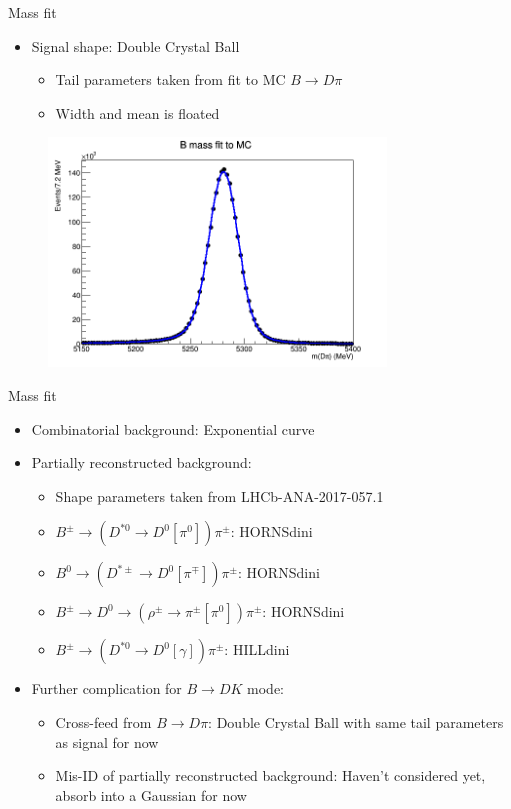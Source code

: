 \documentclass{beamer}
\begin{document}
\begin{frame}{Mass fit}
  \begin{itemize}
    \item{Signal shape: Double Crystal Ball}
    \begin{itemize}
      \item{Tail parameters taken from fit to MC $B\to D\pi$}
      \item{Width and mean is floated}
    \end{itemize}
  \end{itemize}
  \begin{figure}
    \includegraphics[width = 0.8\textwidth]{MassFitMC.png}
  \end{figure}
\end{frame}

\begin{frame}{Mass fit}
  \begin{itemize}
    \setlength\itemsep{1.3em}
    \item{Combinatorial background: Exponential curve}
    \item{Partially reconstructed background:}
    \begin{itemize}
      \item{Shape parameters taken from LHCb-ANA-2017-057.1}
      \item{$B^\pm\to(D^{*0}\to D^0[\pi^0])\pi^\pm$: HORNSdini}
      \item{$B^0\to(D^{*\pm}\to D^0[\pi^\mp])\pi^\pm$: HORNSdini}
      \item{$B^\pm\to D^0\to(\rho^\pm\to\pi^\pm[\pi^0])\pi^\pm$: HORNSdini}
      \item{$B^\pm\to(D^{*0}\to D^0[\gamma])\pi^\pm$: HILLdini}
    \end{itemize}
    \item{Further complication for $B\to DK$ mode:}
    \begin{itemize}
      \item{Cross-feed from $B\to D\pi$: Double Crystal Ball with same tail parameters as signal for now}
      \item{Mis-ID of partially reconstructed background: Haven't considered yet, absorb into a Gaussian for now}
    \end{itemize}
  \end{itemize}
\end{frame}
\end{document}
